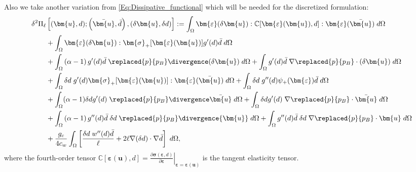 Also we take another variation from \eqref{Eq:Dissipative_functional} which will be needed for the discretized formulation:
\begin{equation}\label{Eq:Tangent}
    \begin{aligned}
        \delta^2 \Pi_\ell & \left[(\bm{u}, d); \left(\bar{\bm{u}}, \bar{d}\right), (\delta \bm{u}, \delta d)\right]
        := \int_\Omega \bm{\varepsilon}(\delta\bm{u}): \mathbb{C}[\bm{\varepsilon}(\bm{u}), d] : \bm{\varepsilon}(\bar{\bm{u}})  \;d\Omega \\
        & + \int_\Omega  \bm{\varepsilon}(\delta\bm{u}):\bm{\sigma}_+[\bm{    \varepsilon}(\bm{u})] g'(d) \bar d\; d\Omega \\
        &+\int_{\Omega} \left(\alpha-1\right)g'(d)\bar{d}\; \replaced{p}{p_B} \divergence (\delta {\bm{u}}) \; d\Omega +\int_{\Omega} g'(d)\bar{d}\; \nabla \replaced{p}{p_B} \cdot (\delta {\bm{u}}) \; d\Omega \\
	    & + \int_\Omega \delta d \;g'(d)  \bm{\sigma}_+[\bm{\varepsilon}(\bm{u})]: \bm{\varepsilon}(\bar{\bm{u}})  \;d\Omega + \int_\Omega \delta d \;g''(d) \psi_+(\bm{\varepsilon}) \bar d \; d\Omega\\ &+\int_{\Omega} (\alpha-1)\delta d g'(d) \; \replaced{p}{p_B} \divergence \bar{\bm{u}} \; d\Omega +\int_{\Omega} \delta d g'(d) \; \nabla \replaced{p}{p_B} \cdot \bar{\bm{u}} \; d\Omega  \\
	    & +\int_{\Omega} \left(\alpha-1\right) g''(d)\bar{d} \; \delta d \; \replaced{p}{p_B} \divergence {{\bm{u}}} \; d\Omega +\int_{\Omega}  g''(d)\bar{d} \; \delta d \; \nabla \replaced{p}{p_B} \cdot {{\bm{u}}} \; d\Omega 
	    \\& +
	    \frac{g_c}{4c_w} \int_\Omega  \left[\frac{\delta d \; w''(d) \bar{d}}{\ell} + 2\ell \nabla (\delta d) \cdot \nabla \bar d \right]\;d\Omega,
	\end{aligned}
\end{equation}
where the fourth-order tensor $\mathbb{C}[\bm{\varepsilon}(\bm{u}), d] = \left.\frac{\partial \bm{\sigma}(\bm{\varepsilon}, d)}{\partial \bm{\varepsilon}}\right|_{\bm{\varepsilon}=\bm{\varepsilon}(\bm{u})}$ is the tangent elasticity tensor.
